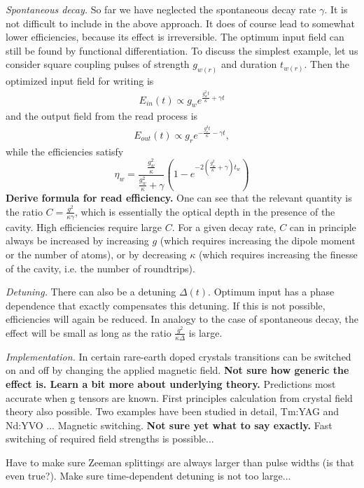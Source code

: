 \documentclass[aps,prl,twocolumn]{revtex4}
\begin{document}
{\it Spontaneous decay.} So far we have neglected the spontaneous decay rate $\gamma$. It is not difficult to include in the above approach. It does of course lead to somewhat lower efficiencies, because its effect is irreversible. The optimum input field can still be found by functional differentiation. To discuss the simplest example, let us consider square coupling pulses of strength $g_{w(r)}$ and duration $t_{w(r)}$. Then the optimized input field for writing is
\begin{eqnarray}
E_{in}(t) \propto g_w e^{\frac{g_w^2 t}{\kappa}+\gamma t}
\end{eqnarray}
and the output field from the read process is
\begin{eqnarray}
E_{out}(t) \propto g_r e^{-\frac{g_r^2 t}{\kappa}-\gamma t},
\end{eqnarray}
while the efficiencies satisfy
\begin{equation}
\eta_{w}=\frac{\frac{g_w^2}{\kappa}}{\frac{g_w^2}{\kappa}+\gamma}
\left(1-e^{-2(\frac{g_w^2}{\kappa}+\gamma) t_w} \right)
\end{equation}
{\bf Derive formula for read efficiency.} One can see that the relevant quantity is the ratio $C=\frac{g^2}{\kappa \gamma}$, which is essentially the optical depth in the presence of the cavity. High efficiencies require large $C$. For a given decay rate, $C$ can in principle always be increased by increasing $g$ (which requires increasing the dipole moment or the number of atoms), or by decreasing $\kappa$ (which requires increasing the finesse of the cavity, i.e. the number of roundtrips).

{\it Detuning.} There can also be a detuning $\Delta(t)$. Optimum input has a phase dependence that exactly compensates this detuning. If this is not possible, efficiencies will again be reduced. In analogy to the case of spontaneous decay, the effect will be small as long as the ratio $\frac{g^2}{\kappa \Delta}$ is large.

{\it Implementation.} In certain rare-earth doped crystals transitions can be switched on and off by changing the applied magnetic field. {\bf Not sure how generic the effect is. Learn a bit more about underlying theory.} Predictions most accurate when g tensors are known. First principles calculation from crystal field theory also possible. Two examples have been studied in detail, Tm:YAG and Nd:YVO ...
Magnetic switching. {\bf Not sure yet what to say exactly.} Fast switching of required field strengths is possible...

Have to make sure Zeeman splittings are always larger than pulse widths (is that even true?). Make sure time-dependent detuning is not too large...
\end{document}
